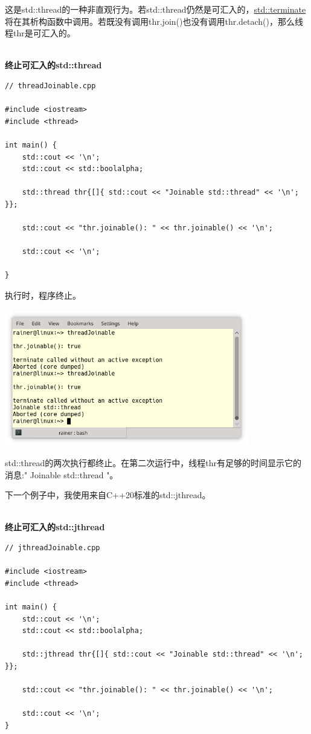 
这是std::thread的一种非直观行为。若std::thread仍然是可汇入的，\href{https://en.cppreference.com/w/cpp/error/terminate}{std::terminate}将在其析构函数中调用。若既没有调用thr.join()也没有调用thr.detach()，那么线程thr是可汇入的。

\hspace*{\fill} \\ %
\noindent
\textbf{终止可汇入的std::thread}
\begin{lstlisting}[style=styleCXX]
// threadJoinable.cpp

#include <iostream>
#include <thread>

int main() {
	std::cout << '\n';
	std::cout << std::boolalpha;
	
	std::thread thr{[]{ std::cout << "Joinable std::thread" << '\n'; }};
	
	std::cout << "thr.joinable(): " << thr.joinable() << '\n';
	
	std::cout << '\n';
	
}
\end{lstlisting}

执行时，程序终止。

\begin{center}
\includegraphics[width=0.8\textwidth]{content/3/chapter6/images/25.png}\\
\end{center}

std::thread的两次执行都终止。在第二次运行中，线程thr有足够的时间显示它的消息:" Joinable std::thread "。

下一个例子中，我使用来自C++20标准的std::jthread。

\hspace*{\fill} \\ %
\noindent
\textbf{终止可汇入的std::jthread}
\begin{lstlisting}[style=styleCXX]
// jthreadJoinable.cpp

#include <iostream>
#include <thread>

int main() {
	std::cout << '\n';
	std::cout << std::boolalpha;
	
	std::jthread thr{[]{ std::cout << "Joinable std::thread" << '\n'; }};
	
	std::cout << "thr.joinable(): " << thr.joinable() << '\n';
	
	std::cout << '\n';
}
\end{lstlisting}

